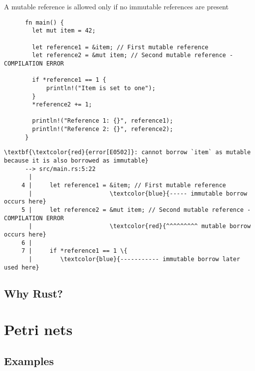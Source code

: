 \documentclass{beamer}
\begin{document}
\begin{frame}[fragile]{A mutable reference is allowed only if no immutable references are present}
  \begin{listing}
    \begin{verbatim}
      fn main() {
        let mut item = 42;
    
        let reference1 = &item; // First mutable reference
        let reference2 = &mut item; // Second mutable reference - COMPILATION ERROR
    
        if *reference1 == 1 {
            println!("Item is set to one");
        }
        *reference2 += 1;
    
        println!("Reference 1: {}", reference1);
        println!("Reference 2: {}", reference2);
      }
    \end{verbatim}
  \end{listing}

  \begin{listing}
    \tiny
    \begin{Verbatim}[commandchars=\\\{\}]
      \textbf{\textcolor{red}{error[E0502]}: cannot borrow `item` as mutable because it is also borrowed as immutable}
      --> src/main.rs:5:22
       |
     4 |     let reference1 = &item; // First mutable reference
       |                      \textcolor{blue}{----- immutable borrow occurs here}
     5 |     let reference2 = &mut item; // Second mutable reference - COMPILATION ERROR
       |                      \textcolor{red}{^^^^^^^^^ mutable borrow occurs here}
     6 |
     7 |     if *reference1 == 1 \{
       |        \textcolor{blue}{----------- immutable borrow later used here}
    \end{Verbatim}
  \end{listing}
\end{frame}

\subsection{Why Rust?}

\section{Petri nets}

\subsection{Examples}
\end{document}
